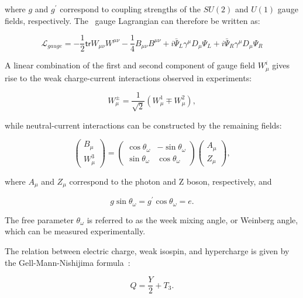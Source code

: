 where $g$ and $g^{\prime}$ correspond to coupling strengths of the $SU(2)$ and $U(1)$ gauge fields, respectively. The \ew~gauge Lagrangian can therefore be written as:

\begin{equation}
\label{eq:LagGauge}
\mathcal{L}_{gauge}=-\frac{1}{2}\textsf{tr}W_{\mu\nu}W^{\mu\nu}-\frac{1}{4}B_{\mu\nu}B^{\mu\nu}+i\bar{\Psi}_{L}\gamma^{\mu}D_{\mu}\Psi_{L}+i\bar{\Psi}_{R}\gamma^{\mu}D_{\mu}\Psi_{R}
\end{equation}

A linear combination of the first and second component of gauge field $W_{\mu}^{i}$ gives rise to the weak charge-current interactions observed in experiments:

\begin{equation}
\label{eq:CC}
W^{\pm}_{\mu}=\frac{1}{\sqrt{2}}(W^{1}_{\mu}\mp W^{2}_{\mu}),
\end{equation}

while neutral-current interactions can be constructed by the remaining fields:

\begin{equation}
\label{eq:NC}
\begin{pmatrix}B_{\mu}\\W_{\mu}^{3}\end{pmatrix}=\begin{pmatrix}\cos\theta_{\omega}&-\sin\theta_{\omega}\\\sin\theta_{\omega}&\cos\theta_{\omega}\end{pmatrix}\begin{pmatrix}A_{\mu}\\Z_{\mu}\end{pmatrix},
\end{equation}

where $A_{\mu}$ and $Z_{\mu}$ correspond to the photon and Z boson, respectively, and 

\begin{equation}
\label{eq:MixAngle}
g\sin\theta_{\omega}=g^{\prime}\cos\theta_{\omega}=e.
\end{equation}

The free parameter $\theta_{\omega}$ is referred to as the week mixing angle, or Weinberg angle, which can be measured experimentally.

The relation between electric charge, weak isospin, and hypercharge is given by the Gell-Mann-Nishijima formula~\cite{Nakano:1953zz,Gell-Mann:1956iqa}:

\begin{equation}
Q=\frac{Y}{2}+T_{3}.
\end{equation}

